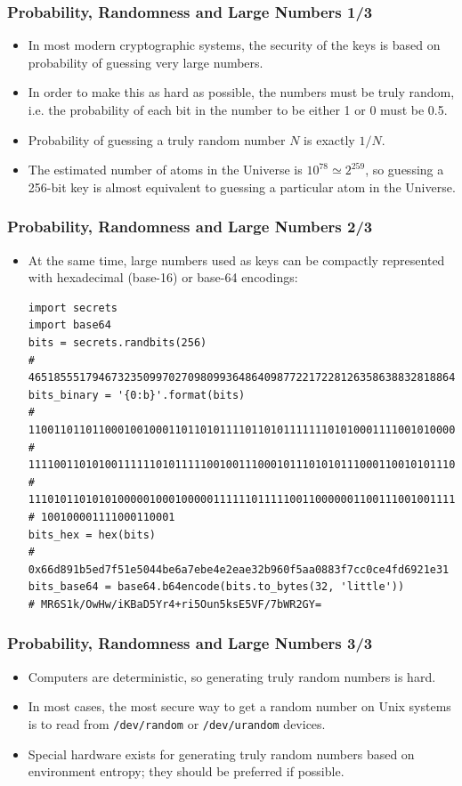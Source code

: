 \documentclass{beamer}
\begin{document}
\begin{frame}[fragile]
  \frametitle{Probability, Randomness and Large Numbers 1/3}
  \begin{itemize}
  \item In most modern cryptographic systems, the security of the keys is based
    on probability of guessing very large numbers.
  \item In order to make this as hard as possible, the numbers must be truly
    random, i.e. the probability of each bit in the number to be either 1 or 0
    must be 0.5.
  \item Probability of guessing a truly random number $N$ is exactly $1/N$.
  \item The estimated number of atoms in the Universe is
    $10^{78} \simeq 2^{259}$, so guessing a 256-bit key is almost equivalent to
    guessing a particular atom in the Universe.
  \end{itemize}
\end{frame}

\begin{frame}[fragile]
  \frametitle{Probability, Randomness and Large Numbers 2/3}
  \begin{itemize}
  \item At the same time, large numbers used as keys can be compactly
    represented with hexadecimal (base-16) or base-64 encodings:
\begin{verbatim}
import secrets
import base64
bits = secrets.randbits(256)
# 46518555179467323509970270980993648640987722172281263586388328188640792550961
bits_binary = '{0:b}'.format(bits)
# 110011011011000100100011011010111101101011111110101000111100101000001000100101\
# 111100110101001111110101111100100111000101110101011100011001010111001011000001\
# 111010110101010000010001000001111110111110011000000110011100100111111010110100\
# 100100001111000110001
bits_hex = hex(bits)
# 0x66d891b5ed7f51e5044be6a7ebe4e2eae32b960f5aa0883f7cc0ce4fd6921e31
bits_base64 = base64.b64encode(bits.to_bytes(32, 'little'))
# MR6S1k/OwHw/iKBaD5Yr4+ri5Oun5ksE5VF/7bWR2GY=
\end{verbatim}
  \end{itemize}
\end{frame}

\begin{frame}[fragile]
  \frametitle{Probability, Randomness and Large Numbers 3/3}
  \begin{itemize}
  \item Computers are deterministic, so generating truly random numbers is hard.
  \item In most cases, the most secure way to get a random number on Unix
    systems is to read from \texttt{/dev/random} or
    \texttt{/dev/urandom} devices.
  \item Special hardware exists for generating truly random numbers based on
    environment entropy; they should be preferred if possible.
  \end{itemize}
\end{frame}
\end{document}
